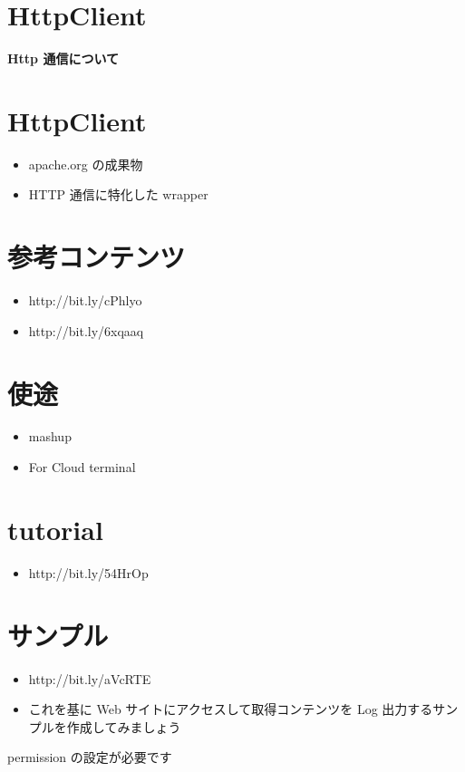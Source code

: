 \documentclass[slide,papersize]{jsarticle}
\begin{document}
\section*{HttpClient}
\vspace*{15mm}
\begin{center}
{\Huge {\bf Http 通信について}}
\end{center}

\section*{HttpClient}
\bigskip
\begin{itemize}
\item apache.org の成果物
\bigskip
\item HTTP 通信に特化した wrapper
\end{itemize}

\section*{参考コンテンツ}
\bigskip
\begin{itemize}
\item http://bit.ly/cPhlyo
\bigskip
\item http://bit.ly/6xqaaq
\end{itemize}

\section*{使途}
\bigskip
\begin{itemize}
\item mashup
\bigskip
\item For Cloud terminal
\end{itemize}

\section*{tutorial}
\bigskip
\begin{itemize}
\item http://bit.ly/54HrOp
\end{itemize}

\section*{サンプル}
\bigskip
\begin{itemize}
\item http://bit.ly/aVcRTE
\bigskip
\item これを基に Web サイトにアクセスして取得コンテンツを Log 出力するサンプルを作成してみましょう
\end{itemize}
permission の設定が必要です
\end{document}
